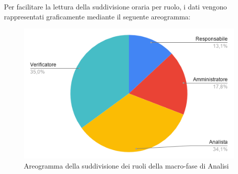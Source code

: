 \documentclass[../piano-di-progetto.tex]{subfiles}
\begin{document}
  Per facilitare la lettura della suddivisione oraria per ruolo, i dati vengono rappresentati graficamente mediante il seguente areogramma:
  \begin{figure}[H]
    \centering
    \includegraphics[width=12cm]{img/ruoli-analisi.png}
    \caption{Areogramma della suddivisione dei ruoli della macro-fase di Analisi}
    \label{fig:ore-ruolo-analisi}
  \end{figure}
\end{document}

